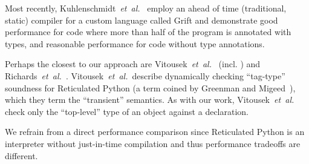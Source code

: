 
Most recently, Kuhlenschmidt~\textit{et~al.}~\cite{Kuhlenschmidt:2018:preprint} employ an
ahead of time (\ie traditional, static) compiler for a custom
language called Grift and demonstrate good performance for code where more than
half of the program is annotated with types, and reasonable
performance for code without type annotations.

\label{reticRW}
Perhaps the closest to our approach are
Vitousek~\textit{et~al.}~\cite{reticPython2014} (incl. \citep{Vitousek2017,Greenman2018})
and Richards~\textit{et~al.}~\cite{Richards2017}.
Vitousek~\textit{et~al.}~describe dynamically checking ``tag-type''
soundness for Reticulated Python (a term coined by Greenman
and Migeed~\cite{Greenman2018}), which they term the ``transient'' semantics.
As with our work, Vitousek~\textit{et~al.} check
only the ``top-level'' type of an
object against a declaration.

%
We refrain from a direct performance comparison since
Reticulated Python is an interpreter without just-in-time compilation
and thus performance tradeoffs are different.


